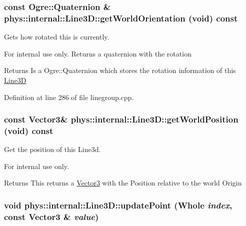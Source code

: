 \hypertarget{classphys_1_1internal_1_1Line3D_a68aea39fc0eee3eeb744c5cd151ef209}{
\subsubsection[{getWorldOrientation}]{\setlength{\rightskip}{0pt plus 5cm}const Ogre::Quaternion \& phys::internal::Line3D::getWorldOrientation (void) const}}
\label{d4/db5/classphys_1_1internal_1_1Line3D_a68aea39fc0eee3eeb744c5cd151ef209}


Gets how rotated this is currently. 

\begin{DoxyInternal}{For internal use only.}
Returns a quaternion with the rotation \begin{DoxyReturn}{Returns}
Is a Ogre::Quaternion which stores the rotation information of this \hyperlink{classphys_1_1internal_1_1Line3D}{Line3D} 
\end{DoxyReturn}
\end{DoxyInternal}


Definition at line 286 of file linegroup.cpp.

\hypertarget{classphys_1_1internal_1_1Line3D_a5bf47edcb7d369718c40c56d9db11b29}{
\subsubsection[{getWorldPosition}]{\setlength{\rightskip}{0pt plus 5cm}const {\bf Vector3}\& phys::internal::Line3D::getWorldPosition (void) const}}
\label{d4/db5/classphys_1_1internal_1_1Line3D_a5bf47edcb7d369718c40c56d9db11b29}


Get the position of this Line3d. 

\begin{DoxyInternal}{For internal use only.}
\begin{DoxyReturn}{Returns}
This returns a \hyperlink{classphys_1_1Vector3}{Vector3} with the Position relative to the world Origin 
\end{DoxyReturn}
\end{DoxyInternal}
\hypertarget{classphys_1_1internal_1_1Line3D_a4b2dec1619e4456ab0cb034ad34eb9d1}{
\subsubsection[{updatePoint}]{\setlength{\rightskip}{0pt plus 5cm}void phys::internal::Line3D::updatePoint ({\bf Whole} {\em index}, \/  const {\bf Vector3} \& {\em value})}}
\label{d4/db5/classphys_1_1internal_1_1Line3D_a4b2dec1619e4456ab0cb034ad34eb9d1}


